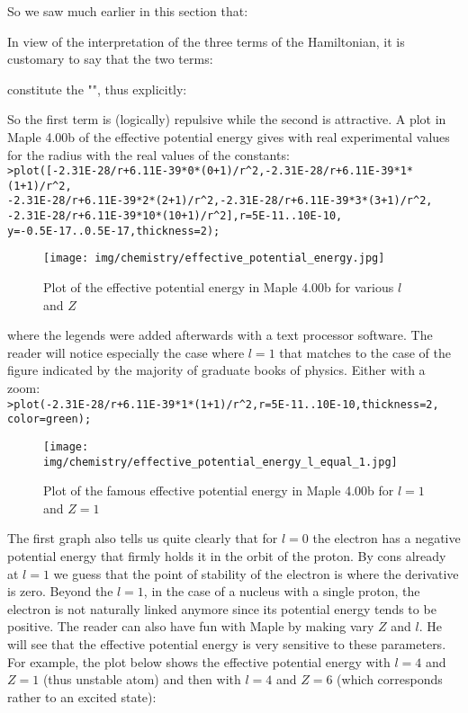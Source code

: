 	So we saw much earlier in this section that:
	
	In view of the interpretation of the three terms of the Hamiltonian, it is customary to say that the two terms:
	
	constitute the "\label{effective potential hydrogen atom}", thus explicitly:
	
	So the first term is (logically) repulsive while the second is attractive. A plot in Maple 4.00b of the effective potential energy gives with real experimental values for the radius with the real values of the constants:\\
	
	\texttt{>plot([-2.31E-28/r+6.11E-39*0*(0+1)/r\string^2,-2.31E-28/r+6.11E-39*1*(1+1)/r\string^2,\\-2.31E-28/r+6.11E-39*2*(2+1)/r\string^2,-2.31E-28/r+6.11E-39*3*(3+1)/r\string^2,\\-2.31E-28/r+6.11E-39*10*(10+1)/r\string^2],r=5E-11..10E-10,\\y=-0.5E-17..0.5E-17,thickness=2);}
	\begin{figure}[H]
		\begin{center}
		\texttt{[image: img/chemistry/effective\_potential\_energy.jpg]}
		\end{center}	
		\caption{Plot of the effective potential energy in Maple 4.00b for various $l$ and $Z$}
	\end{figure}
	where the legends were added afterwards with a text processor software. The reader will notice especially the case where $l=1$ that matches to the case of the figure indicated by the majority of graduate books of physics. Either with a zoom:\\

	\texttt{>plot(-2.31E-28/r+6.11E-39*1*(1+1)/r\string^2,r=5E-11..10E-10,thickness=2, color=green);}
	\begin{figure}[H]
		\begin{center}
		\texttt{[image: img/chemistry/effective\_potential\_energy\_l\_equal\_1.jpg]}
		\end{center}	
		\caption{Plot of the famous effective potential energy in Maple 4.00b for  $l=1$ and $Z=1$}
	\end{figure}

	The first graph also tells us quite clearly that for $l= 0$ the electron has a negative potential energy that firmly holds it in the orbit of the proton. By cons already at $l= 1$ we guess that the point of stability of the electron is where the derivative is zero. Beyond the $l= 1$, in the case of a nucleus with a single proton, the electron is not naturally linked anymore since its potential energy tends to be positive. The reader can also have fun with Maple by making vary $Z$ and $l$. He will see that the effective potential energy is very sensitive to these parameters. For example, the plot below shows the effective potential energy with $l= 4$ and $Z = 1$ (thus unstable atom) and then with $l = 4$ and $Z = 6$ (which corresponds rather to an excited state):\\

